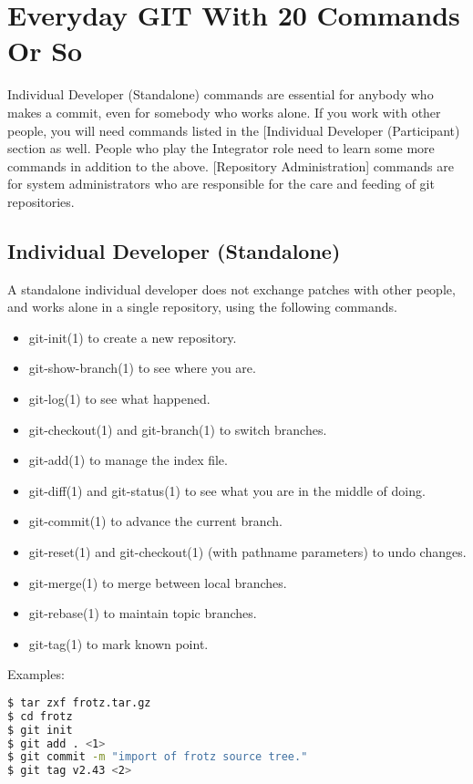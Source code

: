\section{Everyday GIT With 20 Commands Or So}
Individual Developer (Standalone) commands are essential for anybody who makes
a commit, even for somebody who works alone.  If you work with other people,
you will need commands listed in the [Individual Developer (Participant)
section as well.  People who play the Integrator role need to learn some more
commands in addition to the above.  [Repository Administration] commands are
for system administrators who are responsible for the care and feeding of git
repositories.

\subsection{Individual Developer (Standalone)}
A standalone individual developer does not exchange patches with other people,
and works alone in a single repository, using the following commands.

\begin{itemize}
\setlength{\itemsep}{0cm}
\setlength{\parskip}{0cm}
\item git-init(1) to create a new repository.
\item git-show-branch(1) to see where you are.
\item git-log(1) to see what happened.
\item git-checkout(1) and git-branch(1) to switch branches.
\item git-add(1) to manage the index file.
\item git-diff(1) and git-status(1) to see what you are in the middle of doing.
\item git-commit(1) to advance the current branch.
\item git-reset(1) and git-checkout(1) (with pathname parameters) to undo changes.
\item git-merge(1) to merge between local branches.
\item git-rebase(1) to maintain topic branches.
\item git-tag(1) to mark known point.
\end{itemize}

Examples:\\
\lstset{basicstyle=\scriptsize, numbers=none, captionpos=b, tabsize=4}
\begin{lstlisting}[caption=Use a tarball as a starting point for a new repository,language={bash},
breaklines=true,label=lst:useatarballasastartingpointforanewrepository]
$ tar zxf frotz.tar.gz
$ cd frotz
$ git init
$ git add . <1>
$ git commit -m "import of frotz source tree."
$ git tag v2.43 <2>
\end{lstlisting}

